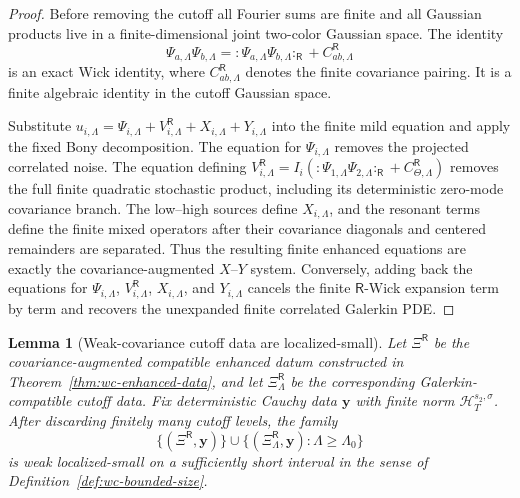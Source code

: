 \documentclass[10pt]{amsart}
\numberwithin{equation}{section}
\theoremstyle{plain}
\newtheorem{lemma}[theorem]{Lemma}
\theoremstyle{definition}
\theoremstyle{remark}
\begin{document}
\begin{proof}
Before removing the cutoff all Fourier sums are finite and all Gaussian products live in a finite-dimensional joint two-color Gaussian space.  The identity
\begin{equation}
        \Psi_{a,\Lambda}\Psi_{b,\Lambda}
        =:\Psi_{a,\Lambda}\Psi_{b,\Lambda}:_{\mathsf R}
        +C_{ab,\Lambda}^{\mathsf R}
\end{equation}
is an exact Wick identity, where \(C_{ab,\Lambda}^{\mathsf R}\) denotes the finite covariance pairing.  It is a finite algebraic identity in the cutoff Gaussian space.

Substitute \(u_{i,\Lambda}=\Psi_{i,\Lambda}+V_{i,\Lambda}^{\mathsf R}+X_{i,\Lambda}+Y_{i,\Lambda}\) into the finite mild equation and apply the fixed Bony decomposition.  The equation for \(\Psi_{i,\Lambda}\) removes the projected correlated noise.  The equation defining \(V_{i,\Lambda}^{\mathsf R}=I_i(:\Psi_{1,\Lambda}\Psi_{2,\Lambda}:_{\mathsf R}+C_{\Theta,\Lambda}^{\mathsf R})\) removes the full finite quadratic stochastic product, including its deterministic zero-mode covariance branch.  The low--high sources define \(X_{i,\Lambda}\), and the resonant terms define the finite mixed operators after their covariance diagonals and centered remainders are separated.  Thus the resulting finite enhanced equations are exactly the covariance-augmented \(X\)--\(Y\) system.  Conversely, adding back the equations for \(\Psi_{i,\Lambda}\), \(V_{i,\Lambda}^{\mathsf R}\), \(X_{i,\Lambda}\), and \(Y_{i,\Lambda}\) cancels the finite \(\mathsf R\)-Wick expansion term by term and recovers the unexpanded finite correlated Galerkin PDE.
\end{proof}


\begin{lemma}[Weak-covariance cutoff data are localized-small]\label{lem:wc-cutoff-localized-small}
Let \(\Xi^{\mathsf R}\) be the covariance-augmented compatible enhanced datum constructed in Theorem~\ref{thm:wc-enhanced-data}, and let \(\Xi^{\mathsf R}_\Lambda\) be the corresponding Galerkin-compatible cutoff data.  Fix deterministic Cauchy data \(\mathbf y\) with finite norm \(\mathcal H_T^{s_2,\sigma}\).  After discarding finitely many cutoff levels, the family
\[
        \{(\Xi^{\mathsf R},\mathbf y)\}
        \cup \{(\Xi^{\mathsf R}_\Lambda,\mathbf y):\Lambda\ge\Lambda_0\}
\]
is weak localized-small on a sufficiently short interval in the sense of Definition~\ref{def:wc-bounded-size}.
\end{lemma}
\end{document}
